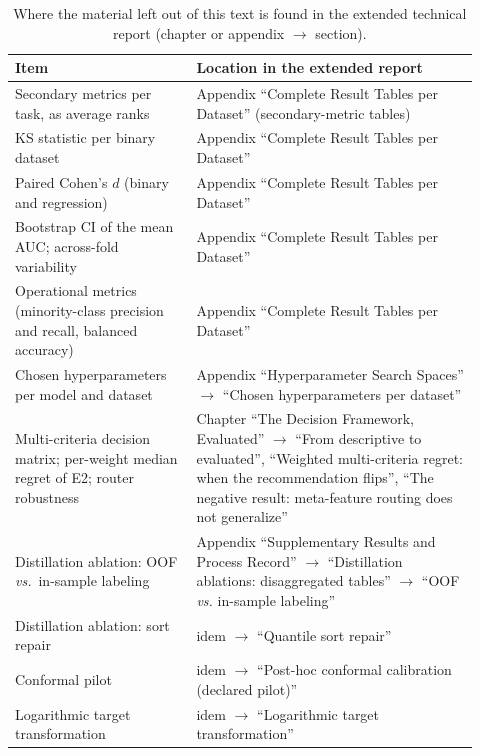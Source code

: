 \begin{table}[htbp]
\centering
\caption[Map to the extended report]{Where the material left out of
this text is found in the extended technical report (chapter or
appendix $\rightarrow$ section).}
\label{tab:app-mapa}
\small
\begin{tabular}{>{\raggedright\arraybackslash}p{0.36\linewidth}>{\raggedright\arraybackslash}p{0.56\linewidth}}
\toprule
Item & Location in the extended report \\
\midrule
Secondary metrics per task, as average ranks & Appendix ``Complete
Result Tables per Dataset'' (secondary-metric tables) \\
\addlinespace[2pt]
KS statistic per binary dataset & Appendix ``Complete Result Tables
per Dataset'' \\
\addlinespace[2pt]
Paired Cohen's $d$ (binary and regression) & Appendix ``Complete
Result Tables per Dataset'' \\
\addlinespace[2pt]
Bootstrap CI of the mean AUC; across-fold variability & Appendix
``Complete Result Tables per Dataset'' \\
\addlinespace[2pt]
Operational metrics (minority-class precision and recall, balanced
accuracy) & Appendix ``Complete Result Tables per Dataset'' \\
\addlinespace[2pt]
Chosen hyperparameters per model and dataset & Appendix
``Hyperparameter Search Spaces'' $\rightarrow$ ``Chosen
hyperparameters per dataset'' \\
\addlinespace[2pt]
Multi-criteria decision matrix; per-weight median regret of E2;
router robustness & Chapter ``The Decision Framework, Evaluated''
$\rightarrow$ ``From descriptive to evaluated'', ``Weighted
multi-criteria regret: when the recommendation flips'', ``The
negative result: meta-feature routing does not generalize'' \\
\addlinespace[2pt]
Distillation ablation: OOF \emph{vs.}\ in-sample labeling & Appendix
``Supplementary Results and Process Record'' $\rightarrow$
``Distillation ablations: disaggregated tables'' $\rightarrow$ ``OOF
\emph{vs.} in-sample labeling'' \\
\addlinespace[2pt]
Distillation ablation: sort repair & idem $\rightarrow$ ``Quantile
sort repair'' \\
\addlinespace[2pt]
Conformal pilot & idem $\rightarrow$ ``Post-hoc conformal calibration
(declared pilot)'' \\
\addlinespace[2pt]
Logarithmic target transformation & idem $\rightarrow$ ``Logarithmic
target transformation'' \\

\end{tabular}
\end{table}
